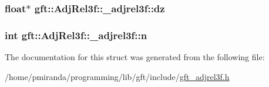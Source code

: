 \subsubsection[{\texorpdfstring{dz}{dz}}]{\setlength{\rightskip}{0pt plus 5cm}float$\ast$ gft\+::\+Adj\+Rel3f\+::\+\_\+adjrel3f\+::dz}\hypertarget{structgft_1_1AdjRel3f_1_1__adjrel3f_a9f5466eaebc904592f473a52da0f9127}{}\label{structgft_1_1AdjRel3f_1_1__adjrel3f_a9f5466eaebc904592f473a52da0f9127}
\subsubsection[{\texorpdfstring{n}{n}}]{\setlength{\rightskip}{0pt plus 5cm}int gft\+::\+Adj\+Rel3f\+::\+\_\+adjrel3f\+::n}\hypertarget{structgft_1_1AdjRel3f_1_1__adjrel3f_af1b74ab4843c76ffb8aef6ebcd06b086}{}\label{structgft_1_1AdjRel3f_1_1__adjrel3f_af1b74ab4843c76ffb8aef6ebcd06b086}


The documentation for this struct was generated from the following file\+:\begin{DoxyCompactItemize}
\item 
/home/pmiranda/programming/lib/gft/include/\hyperlink{gft__adjrel3f_8h}{gft\+\_\+adjrel3f.\+h}\end{DoxyCompactItemize}
